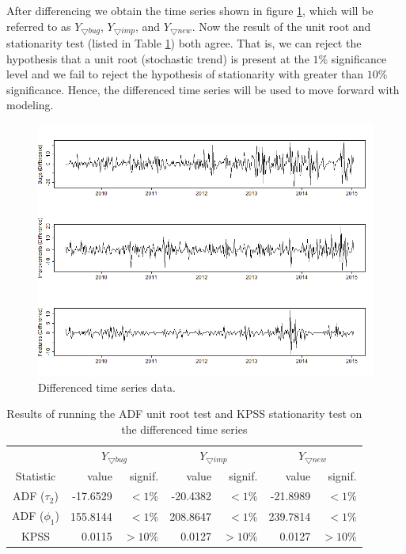 \documentclass[letterpaper]{report}
\begin{document}
After differencing we obtain the time series shown in figure \ref{fig:differenced_time_series}, which will be referred to as $Y_{\bigtriangledown bug}$, $Y_{\bigtriangledown imp}$, and $Y_{\bigtriangledown new}$. Now the result of the unit root and stationarity test (listed in Table \ref{tab:first_diff_stationarity_results}) both agree. That is, we can reject the hypothesis that a unit root (stochastic trend) is present at the $1\%$  significance level and we fail to reject the hypothesis of stationarity with greater than $10\%$ significance. Hence, the differenced time series will be used to move forward with modeling.

\begin{figure}[htbp]
\begin{center}
\includegraphics[width=\textwidth]{assets/time_series_diff}
\caption[Differenced time series]{Differenced time series data.}
\label{fig:differenced_time_series}
\end{center}
\end{figure}

\begin{table}[htbp]
  \centering
  \begin{tabular}{ c | r r | r r | r r }
      & \multicolumn{2}{|c|}{$Y_{\bigtriangledown bug}$} & \multicolumn{2}{|c|}{$Y_{\bigtriangledown imp}$} & \multicolumn{2}{|c}{$Y_{\bigtriangledown new}$} \\
    Statistic & value & signif. & value & signif. & value & signif. \\
    \hline
    ADF ($\tau_2$) & -17.6529 & $< 1\%$ & -20.4382 & $< 1\%$ & -21.8989 & $< 1\%$ \\
    ADF ($\phi_1$) & 155.8144 & $< 1\%$ & 208.8647 & $< 1\%$ & 239.7814 & $< 1\%$ \\
    KPSS & 0.0115 & $> 10\%$ & 0.0127 & $> 10\%$ & 0.0127 & $> 10\%$ \\
    \hline
  \end{tabular}
\caption[Stationary test results for differenced time series]{Results of running the ADF unit root test and KPSS stationarity test on the differenced time series}
\label{tab:first_diff_stationarity_results}
\end{table}
\end{document}
